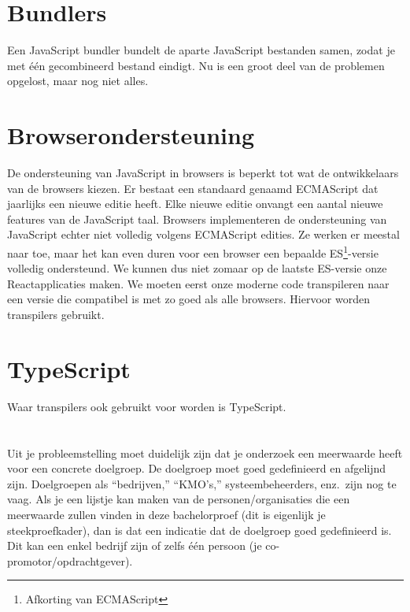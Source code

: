 \section{Bundlers}

Een JavaScript bundler bundelt de aparte JavaScript bestanden samen, zodat je met één gecombineerd bestand eindigt. Nu is een groot deel van de problemen opgelost, maar nog niet alles.

\section{Browserondersteuning}

De ondersteuning van JavaScript in browsers is beperkt tot wat de ontwikkelaars van de browsers kiezen. Er bestaat een standaard genaamd ECMAScript dat jaarlijks een nieuwe editie heeft. Elke nieuwe editie onvangt een aantal nieuwe features van de JavaScript taal. Browsers implementeren de ondersteuning van JavaScript echter niet volledig volgens ECMAScript edities. Ze werken er meestal naar toe, maar het kan even duren voor een browser een bepaalde ES\footnote{Afkorting van ECMAScript}-versie volledig ondersteund. We kunnen dus niet zomaar op de laatste ES-versie onze Reactapplicaties maken. We moeten eerst onze moderne code transpileren naar een versie die compatibel is met zo goed als alle browsers. Hiervoor worden transpilers gebruikt.

\section{TypeScript}

Waar transpilers ook gebruikt voor worden is TypeScript. 


\section{}
\label{sec:probleemstelling}

Uit je probleemstelling moet duidelijk zijn dat je onderzoek een meerwaarde heeft voor een concrete doelgroep. De doelgroep moet goed gedefinieerd en afgelijnd zijn. Doelgroepen als ``bedrijven,'' ``KMO's,'' systeembeheerders, enz.~zijn nog te vaag. Als je een lijstje kan maken van de personen/organisaties die een meerwaarde zullen vinden in deze bachelorproef (dit is eigenlijk je steekproefkader), dan is dat een indicatie dat de doelgroep goed gedefinieerd is. Dit kan een enkel bedrijf zijn of zelfs één persoon (je co-promotor/opdrachtgever).

